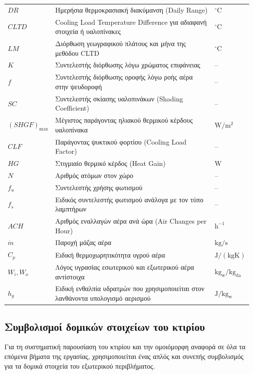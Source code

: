 \documentclass[12pt,a4paper]{article}
\begin{document}
\begin{table}[H]
\begin{tabularx}{\textwidth}{C{2.2cm} L C{2.8cm}}
\(DR\) & Ημερήσια θερμοκρασιακή διακύμανση (\textenglish{Daily Range}) & \({}^\circ\mathrm{C}\) \\
\(CLTD\) & \textenglish{Cooling Load Temperature Difference} για αδιαφανή στοιχεία ή υαλοπίνακες & \({}^\circ\mathrm{C}\) \\
\(LM\) & Διόρθωση γεωγραφικού πλάτους και μήνα της μεθόδου CLTD & \({}^\circ\mathrm{C}\) \\
\(K\) & Συντελεστής διόρθωσης λόγω χρώματος επιφάνειας & -- \\
\(f\) & Συντελεστής διόρθωσης οροφής λόγω ροής αέρα στην ψευδοροφή & -- \\
\(SC\) & Συντελεστής σκίασης υαλοπινάκων (\textenglish{Shading Coefficient}) & -- \\
\((SHGF)_{\max}\) & Μέγιστος παράγοντας ηλιακού θερμικού κέρδους υαλοπίνακα & \(\mathrm{W/m^2}\) \\
\(CLF\) & Παράγοντας ψυκτικού φορτίου (\textenglish{Cooling Load Factor}) & -- \\
\(HG\) & Στιγμιαίο θερμικό κέρδος (\textenglish{Heat Gain}) & \(\mathrm{W}\) \\
\(N\) & Αριθμός ατόμων στον χώρο & -- \\
\(f_u\) & Συντελεστής χρήσης φωτισμού & -- \\
\(f_s\) & Ειδικός συντελεστής φωτισμού ανάλογα με τον τύπο λαμπτήρων & -- \\
\(ACH\) & Αριθμός εναλλαγών αέρα ανά ώρα (\textenglish{Air Changes per Hour}) & \(\mathrm{h^{-1}}\) \\
\(\dot{m}\) & Παροχή μάζας αέρα & \(\mathrm{kg/s}\) \\
\(C_p\) & Ειδική θερμοχωρητικότητα υγρού αέρα & \(\mathrm{J/(kgK)}\) \\
\(W_i, W_o\) & Λόγος υγρασίας εσωτερικού και εξωτερικού αέρα αντίστοιχα & \(\mathrm{kg_w/kg_{da}}\) \\
\(h_g\) & Ειδική ενθαλπία υδρατμών που χρησιμοποιείται στον λανθάνοντα υπολογισμό αερισμού & \(\mathrm{J/kg_w}\) \\
\bottomrule
\end{tabularx}
\end{table}

\subsection{Συμβολισμοί δομικών στοιχείων του κτιρίου}

Για τη συστηματική παρουσίαση του κτιρίου και την ομοιόμορφη αναφορά σε όλα τα επόμενα
βήματα της εργασίας, χρησιμοποιείται ένας απλός και συνεπής συμβολισμός για τα
δομικά στοιχεία του εξωτερικού περιβλήματος.
\end{document}
